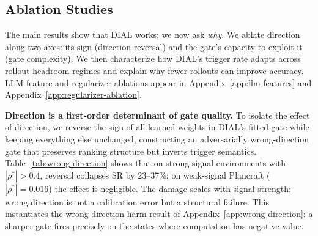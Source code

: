\vspace{-0.15in}
\subsection{Ablation Studies}
\label{sec:ablation}
\vspace{-0.1in}
The main results show that DIAL works; we now ask
\emph{why}. We ablate direction along two axes: its sign
(direction reversal) and the gate's capacity to exploit it
(gate complexity). We then characterize how DIAL's trigger
rate adapts across rollout-headroom regimes and explain why fewer
rollouts can improve accuracy. LLM feature and
regularizer ablations appear in Appendix~\ref{app:llm-features}
and Appendix~\ref{app:regularizer-ablation}.

\begin{table}
\vspace{-2pt}
\caption{Effect of reversing DIAL's learned direction.
$\Delta$SR: reversed $-$ original. $|\rho^*|$ is the
absolute Spearman correlation between the dominant signal
and optimizer utility in each environment. Degradation
scales with $|\rho^*|$.}
\vspace{-.05in}
\label{tab:wrong-direction}
\centering
{}
\vspace{-10pt}
\end{table}
\vspace{-0.025in}
\textbf{Direction is a first-order determinant of gate quality.}
To isolate the effect of direction, we reverse the sign of all learned weights in DIAL's fitted gate while keeping everything
else unchanged, constructing an adversarially wrong-direction gate that preserves ranking structure but inverts trigger
semantics. Table~\ref{tab:wrong-direction} shows that on strong-signal environments with $|\rho^*| > 0.4$,
reversal collapses SR by 23--37\%; on weak-signal Plancraft ($|\rho^*|{=}0.016$) the effect is negligible. The damage scales with signal strength: wrong direction is not a calibration error but a structural failure. This instantiates the
wrong-direction harm result of Appendix~\ref{app:wrong-direction}: a sharper gate fires precisely on the states where
computation has negative value.

